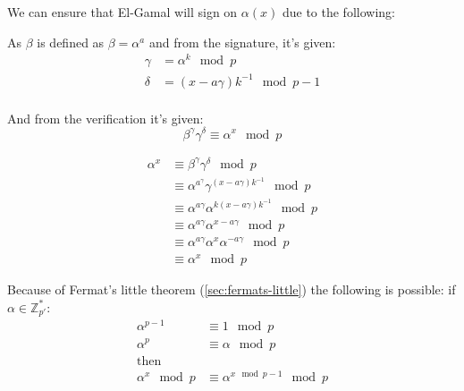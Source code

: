 
We can ensure that El-Gamal will sign on $\alpha(x)$ due to the
following:

As $\beta$ is defined as $\beta = \alpha^{a}$ and from the signature, it's given:
\begin{align*}
  \gamma &= \alpha^k \mod p \\
  \delta &= (x - a \gamma)k^{-1} \mod p - 1 \\
\end{align*}

And from the verification it's given:
\[ \beta^{\gamma}\gamma^{\delta} \equiv \alpha^x \mod p\]

\begin{align*}
  \alpha^x &\equiv \beta^{\gamma}\gamma^{\delta} \mod p\\
  &\equiv \alpha^{a^{\gamma}} \gamma^{(x-a\gamma)k^{-1}} \mod p\\
  &\equiv \alpha^{a\gamma} \alpha^{k(x-a\gamma)k^{-1}} \mod p\\
  &\equiv \alpha^{a\gamma} \alpha^{x-a\gamma} \mod p\\
  &\equiv \alpha^{a\gamma} \alpha^{x}\alpha^{-a\gamma} \mod p\\
  &\equiv \alpha^x \mod p
\end{align*}

Because of Fermat's little theorem (\ref{sec:fermats-little}) the
following is possible: if $\alpha\in \mathbb{Z}_{p'}^*$:
\begin{align*}
  \alpha^{p-1} &\equiv 1 \mod p\\
  \alpha^p &\equiv \alpha \mod p\\
  \text{then}&\\
  \alpha^x \mod p &\equiv \alpha^{x \mod p-1} \mod p
\end{align*}
